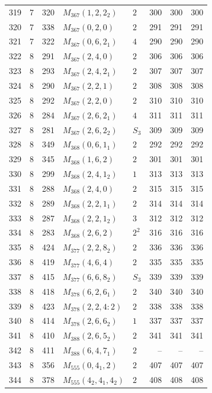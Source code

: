 \documentclass[11pt,a4paper]{article}
\begin{document}
\begin{longtable}{rrr|l|l|rrr}
319 & 7 & 320 & $M_{367}(1,2,2_2)$ & $2$ & 300 & 300 & 300\\
320 & 7 & 338 & $M_{367}(0,2,0)$ & $2$ & 291 & 291 & 291\\
321 & 7 & 322 & $M_{367}(0,6,2_1)$ & $4$ & 290 & 290 & 290\\
322 & 8 & 291 & $M_{367}(2,4,0)$ & $2$ & 306 & 306 & 306\\
323 & 8 & 293 & $M_{367}(2,4,2_1)$ & $2$ & 307 & 307 & 307\\
324 & 8 & 290 & $M_{367}(2,2,1)$ & $2$ & 308 & 308 & 308\\
325 & 8 & 292 & $M_{367}(2,2,0)$ & $2$ & 310 & 310 & 310\\
326 & 8 & 284 & $M_{367}(2,6,2_1)$ & $4$ & 311 & 311 & 311\\
327 & 8 & 281 & $M_{367}(2,6,2_2)$ & $S_3$ & 309 & 309 & 309\\
328 & 8 & 349 & $M_{368}(0,6,1_1)$ & $2$ & 292 & 292 & 292\\
329 & 8 & 345 & $M_{368}(1,6,2)$ & $2$ & 301 & 301 & 301\\
330 & 8 & 299 & $M_{368}(2,4,1_2)$ & $1$ & 313 & 313 & 313\\
331 & 8 & 288 & $M_{368}(2,4,0)$ & $2$ & 315 & 315 & 315\\
332 & 8 & 289 & $M_{368}(2,2,1_1)$ & $2$ & 314 & 314 & 314\\
333 & 8 & 287 & $M_{368}(2,2,1_2)$ & $3$ & 312 & 312 & 312\\
334 & 8 & 283 & $M_{368}(2,6,2)$ & $2^2$ & 316 & 316 & 316\\
335 & 8 & 424 & $M_{377}(2,2,8_2)$ & $2$ & 336 & 336 & 336\\
336 & 8 & 419 & $M_{377}(4,6,4)$ & $2$ & 335 & 335 & 335\\
337 & 8 & 415 & $M_{377}(6,6,8_2)$ & $S_3$ & 339 & 339 & 339\\
338 & 8 & 418 & $M_{378}(6,2,6_1)$ & $2$ & 340 & 340 & 340\\
339 & 8 & 423 & $M_{378}(2,2,4:2)$ & $2$ & 338 & 338 & 338\\
340 & 8 & 414 & $M_{378}(2,6,6_2)$ & $1$ & 337 & 337 & 337\\
341 & 8 & 410 & $M_{388}(2,6,5_2)$ & $2$ & 341 & 341 & 341\\
342 & 8 & 411 & $M_{388}(6,4,7_1)$ & $2$ & -- & -- & --\\
343 & 8 & 356 & $M_{555}(0,4_1,2)$ & $2$ & 407 & 407 & 407\\
344 & 8 & 378 & $M_{555}(4_2,4_1,4_2)$ & $2$ & 408 & 408 & 408\\

\end{longtable}
\end{document}
